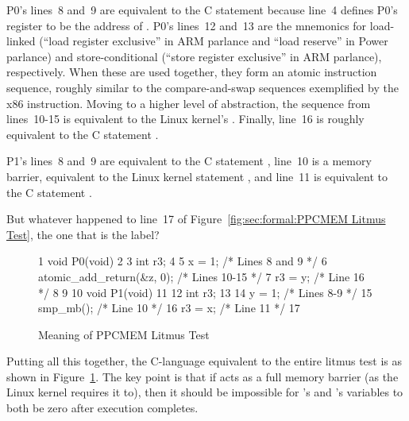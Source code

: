 P0's lines~8 and~9 are equivalent to the C statement  because
line~4 defines P0's register  to be the address of . P0's
lines~12 and~13 are the mnemonics for load-linked (``load register
exclusive'' in ARM parlance and ``load reserve'' in Power parlance)
and store-conditional (``store register exclusive'' in ARM parlance),
respectively. When these are used together, they form an atomic
instruction sequence, roughly similar to the compare-and-swap sequences
exemplified by the x86  instruction. Moving to a higher
level of abstraction, the sequence from lines~10-15 is equivalent to
the Linux kernel's . Finally, line~16 is
roughly equivalent to the C statement .

P1's lines~8 and~9 are equivalent to the C statement , line~10
is a memory barrier, equivalent to the Linux kernel statement ,
and line~11 is equivalent to the C statement .

\QuickQuiz{}
	But whatever happened to line~17 of
	Figure~\ref{fig:sec:formal:PPCMEM Litmus Test},
	the one that is the  label?
 \QuickQuizEnd

\begin{figure}[tbp]
{ \scriptsize
\begin{verbbox}
 1 void P0(void)
 2 {
 3   int r3;
 4 
 5   x = 1; /* Lines 8 and 9 */
 6   atomic_add_return(&z, 0); /* Lines 10-15 */
 7   r3 = y; /* Line 16 */
 8 }
 9 
10 void P1(void)
11 {
12   int r3;
13 
14   y = 1; /* Lines 8-9 */
15   smp_mb(); /* Line 10 */
16   r3 = x; /* Line 11 */
17 }
\end{verbbox}
}
\centering
\theverbbox
\caption{Meaning of PPCMEM Litmus Test}
\label{fig:sec:formal:Meaning of PPCMEM Litmus Test}
\end{figure}

Putting all this together, the C-language equivalent to the entire litmus
test is as shown in
Figure~\ref{fig:sec:formal:Meaning of PPCMEM Litmus Test}.
The key point is that if  acts as a full
memory barrier (as the Linux kernel requires it to), 
then it should be impossible for 's and 's 
variables to both be zero after execution completes.

